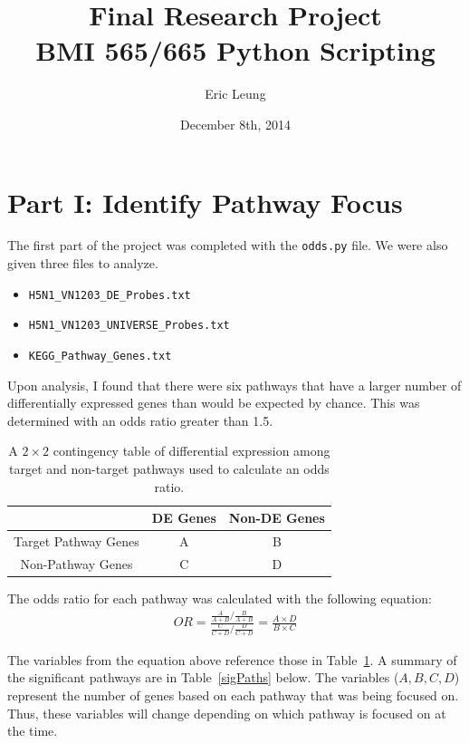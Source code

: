 \documentclass[12pt, a4paper]{report}
\author{Eric Leung}
\title{Final Research Project \\
	BMI 565/665 Python Scripting}
\date{December 8th, 2014}
\begin{document}
\maketitle

\section*{Part I: Identify Pathway Focus}

The first part of the project was completed with the \verb+odds.py+ file. We were also given three files to analyze.
\begin{itemize}
\item \verb+H5N1_VN1203_DE_Probes.txt+
\item \verb+H5N1_VN1203_UNIVERSE_Probes.txt+
\item \verb+KEGG_Pathway_Genes.txt+
\end{itemize}

Upon analysis, I found that there were six pathways that have a larger number of differentially expressed genes than would be expected by chance. This was determined with an odds ratio greater than 1.5.

\begin{table}[ht]
\begin{center}
\begin{tabular}{c|cc}
    ~                    & DE Genes & Non-DE Genes \\ \hline
    Target Pathway Genes & A        & B            \\
    Non-Pathway Genes    & C        & D            \\
\end{tabular}
\caption{A $2 \times 2$ contingency table of differential expression among target and non-target pathways used to calculate an odds ratio. \label{contingent}}
\end{center}
\end{table}

The odds ratio for each pathway was calculated with the following equation:
\begin{align}
OR = 
\frac{ \frac{A}{A+B} / \frac{B}{A+B} } 
{ \frac{C}{C+D} / \frac{D}{C+D}} =
\frac{A \times D}{B \times C}
\end{align}

The variables from the equation above reference those in Table~\ref{contingent}. A summary of the significant pathways are in Table~\ref{sigPaths} below. The variables ($A, B, C, D$) represent the number of genes based on each pathway that was being focused on. Thus, these variables will change depending on which pathway is focused on at the time.
\end{document}
